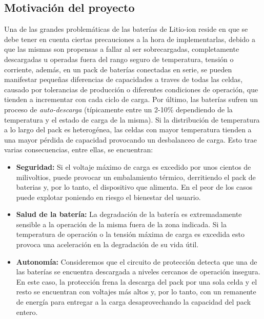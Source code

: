\documentclass[10pt,a4paper]{article}
\begin{document}
\subsection{Motivaci\'on del proyecto}

\noindent Una de las grandes problem\'aticas de las bater\'ias de Litio-ion 
reside en que se debe tener en cuenta ciertas precauciones a la hora de
implementarlas, debido a que las mismas son propensas a fallar al ser 
sobrecargadas, completamente descargadas u operadas fuera del
rango seguro de temperatura, tensi\'on o corriente, adem\'as, en un pack de 
bater\'ias conectadas en serie, se pueden manifestar pequeñas diferencias de 
capacidades a traves de todas las celdas, causado por tolerancias de
producci\'on o diferentes condiciones de operaci\'on, que tienden
a incrementar con cada ciclo de carga. Por \'ultimo, las bater\'ias
sufren un proceso de \emph{auto-descarga} (t\'ipicamente entre un
2-10\% dependiendo de la temperatura y el estado de carga de la misma). 
Si la distribuci\'on de temperatura a lo largo del pack es
heterog\'enea, las celdas con mayor temperatura tienden a una mayor
p\'erdida de capacidad provocando un desbalanceo de carga.
Esto trae varias consecuencias, entre ellas, se encuentran:

\begin{itemize}
    \item \textbf{Seguridad:} Si el voltaje máximo de carga es excedido por 
	unos cientos de milivoltios, puede provocar un embalamiento térmico, 
	derritiendo el pack de baterias y, por lo tanto, el dispositivo que 
	alimenta. En el peor de los casos puede explotar poniendo en riesgo el 
	bienestar del usuario.
    \item \textbf{Salud de la batería:} La degradación de la batería es 
	extremadamente sensible a la operación de la misma fuera de la zona 
	indicada. Si la temperatura de operación o la tensión máxima de carga 
	es excedida esto provoca una aceleración en la degradación de su vida 
	útil.
    \item \textbf{Autonomía:} Consideremos que el circuito de protección 
	detecta que una de las baterías se encuentra descargada a niveles 
	cercanos de operación insegura. En este caso, la protección frena la 
	descarga del pack por una sola celda y el resto se encuentran con 
	voltajes más altos y, por lo tanto, con un remanente de energía para 
	entregar a la carga desaprovechando la capacidad del pack entero.
\end{itemize}
\end{document}
